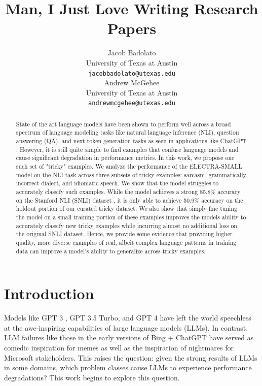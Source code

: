 \documentclass{article}
\title{Man, I Just Love Writing Research Papers}
\author{%
  Jacob Badolato \\
  University of Texas at Austin \\
  \texttt{jacobbadolato@utexas.edu} \\
  \And
  Andrew McGehee \\
  University of Texas at Austin \\
  \texttt{andrewmcgehee@utexas.edu} \\
}
\begin{document}
\maketitle

\begin{abstract}
	State of the art language models have been shown to perform well across a broad spectrum of language modeling tasks like natural language inference (NLI), question answering (QA), and next token generation tasks as seen in applications like ChatGPT \cite{naveed2023comprehensive}. However, it is still quite simple to find examples that confuse language models and cause significant degradation in performance metrics. In this work, we propose one such set of "tricky" examples. We analyze the performance of the ELECTRA-SMALL model \cite{clark2020electra} on the NLI task \cite{bowman-etal-2015-large} across three subsets of tricky examples: sarcasm, grammatically incorrect dialect, and idiomatic speech. We show that the model struggles to accurately classify such examples. While the model achieves a strong 85.8\% accuracy on the Stanford NLI (SNLI) dataset \cite{bowman-etal-2015-large}, it is only able to achieve 50.9\% accuracy on the holdout portion of our curated tricky dataset. We also show that simply fine tuning the model on a small training portion of these examples improves the models ability to accurately classify new tricky examples while incurring almost no additional loss on the original SNLI dataset. Hence, we provide some evidence that providing higher quality, more diverse examples of real, albeit complex language patterns in training data can improve a model's ability to generalize across tricky examples.
\end{abstract}

\section{Introduction}
Models like GPT 3 \cite{brown2020language}, GPT 3.5 Turbo, and \cite{openai2023gpt4} GPT 4 have left the world speechless at the awe-inspiring
capabilities of large language models (LLMs). In contrast, LLM failures like those in the early versions of Bing + ChatGPT
have served as comedic inspiration for memes as well as the inspiration of nightmares for Microsoft stakeholders. This
raises the question: given the strong results of LLMs in some domains, which problem classes cause LLMs to experience
performance degradations? This work begins to explore this question.
\end{document}
